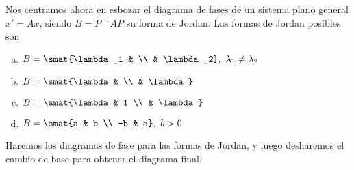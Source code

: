 \documentclass[../main.tex]{subfiles}
\begin{document}
Nos centramos ahora en esbozar el diagrama de fases de un sistema plano general
\(x' = Ax\), siendo \(B = P^{-1}AP\) su forma de Jordan. Las formas de Jordan
posibles son

\begin{enumerate}[a)]
\item \(B = \smat{\lambda_1 & \\ & \lambda_2},\ \lambda_1 \neq \lambda_2\)
\item \(B = \smat{\lambda & \\ & \lambda}\)
\item \(B = \smat{\lambda & 1 \\ & \lambda}\)
\item \(B = \smat{a & b \\ -b & a},\ b>0\)
\end{enumerate}

Haremos los diagramas de fase para las formas de Jordan, y luego desharemos el
cambio de base para obtener el diagrama final.
\end{document}
